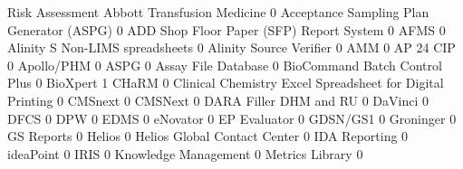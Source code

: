 \documentclass{article}
\begin{document}
\begin{Schunk}
\begin{Soutput}
                                                            Risk Assessment
  Abbott Transfusion Medicine                                             0
  Acceptance Sampling Plan Generator (ASPG)                               0
  ADD Shop Floor Paper (SFP) Report System                                0
  AFMS                                                                    0
  Alinity S Non-LIMS spreadsheets                                         0
  Alinity Source Verifier                                                 0
  AMM                                                                     0
  AP 24 CIP                                                               0
  Apollo/PHM                                                              0
  ASPG                                                                    0
  Assay File Database                                                     0
  BioCommand Batch Control Plus                                           0
  BioXpert                                                                1
  CHaRM                                                                   0
  Clinical Chemistry Excel Spreadsheet for Digital Printing               0
  CMSnext                                                                 0
  CMSNext                                                                 0
  DARA Filler DHM and RU                                                  0
  DaVinci                                                                 0
  DFCS                                                                    0
  DPW                                                                     0
  EDMS                                                                    0
  eNovator                                                                0
  EP Evaluator                                                            0
  GDSN/GS1                                                                0
  Groninger                                                               0
  GS Reports                                                              0
  Helios                                                                  0
  Helios Global Contact Center                                            0
  IDA Reporting                                                           0
  ideaPoint                                                               0
  IRIS                                                                    0
  Knowledge Management                                                    0
  Metrics Library                                                         0

\end{Soutput}
\end{Schunk}
\end{document}
